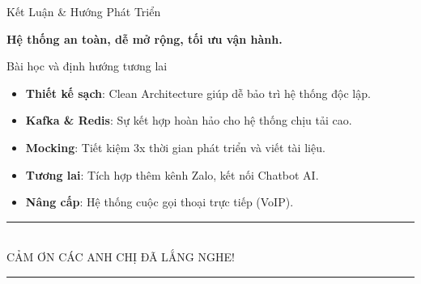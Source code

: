 \documentclass[aspectratio=169, 10pt]{beamer}
\begin{document}
\begin{frame}{Kết Luận \& Hướng Phát Triển}
    \begin{center}
        \large\textbf{\color{accent}Hệ thống an toàn, dễ mở rộng, tối ưu vận hành.}
    \end{center}
    \vspace{0.4cm}
    \begin{block}{Bài học và định hướng tương lai}
        \begin{itemize}
            \item \textbf{Thiết kế sạch}: Clean Architecture giúp dễ bảo trì hệ thống độc lập.
            \item \textbf{Kafka \& Redis}: Sự kết hợp hoàn hảo cho hệ thống chịu tải cao.
            \item \textbf{Mocking}: Tiết kiệm 3x thời gian phát triển và viết tài liệu.
            \item \textbf{Tương lai}: Tích hợp thêm kênh Zalo, kết nối Chatbot AI.
            \item \textbf{Nâng cấp}: Hệ thống cuộc gọi thoại trực tiếp (VoIP).
        \end{itemize}
    \end{block}
\end{frame}

\begin{frame}[plain]
    \begin{center}
        \vspace{2.2cm}
        {\color{accent}\rule{0.6\linewidth}{1.5pt}} \\[0.6cm]
        {\color{primary}CẢM ƠN CÁC ANH CHỊ ĐÃ LẮNG NGHE!} \\[0.6cm]
        {\color{accent}\rule{0.6\linewidth}{1.5pt}}
    \end{center}
\end{frame}
\end{document}
